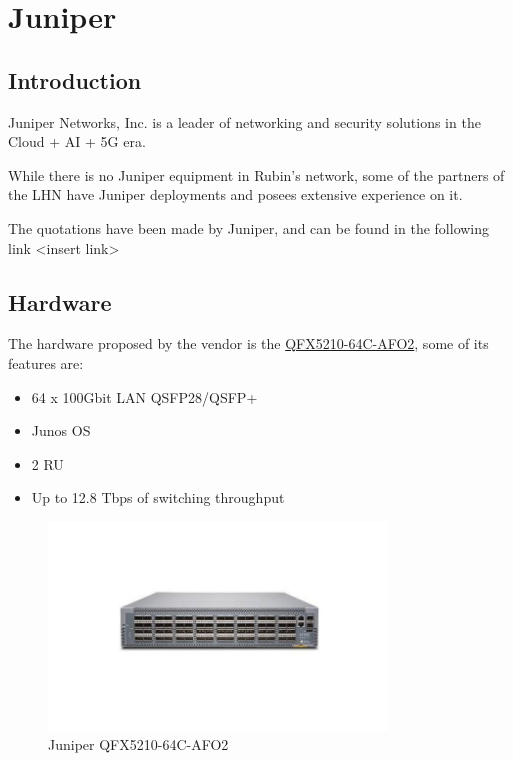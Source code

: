 \section{Juniper}

\subsection{Introduction}

Juniper Networks, Inc. is a leader of networking and security solutions in the Cloud + AI + 5G era.

While there is no Juniper equipment in Rubin's network, some of the partners of the LHN have Juniper deployments and posees extensive experience on it. 

The quotations have been made by Juniper, and can be found in the following link <insert link>

\subsection{Hardware}

The hardware proposed by the vendor is the \href{https://www.juniper.net/us/en/products/switches/qfx-series/qfx5210-switch-datasheet.html}{QFX5210-64C-AFO2}, some of its features are:

\begin{itemize}
\item 64 x 100Gbit LAN QSFP28/QSFP+
\item Junos OS
\item 2 RU 
\item Up to 12.8 Tbps of switching throughput
\end{itemize}

\begin{figure}
    \includegraphics[width=9cm]{images/juniper_qfx5210-64c-afo2.jpeg}
    \centering
    \caption{Juniper QFX5210-64C-AFO2}
  \end{figure}


